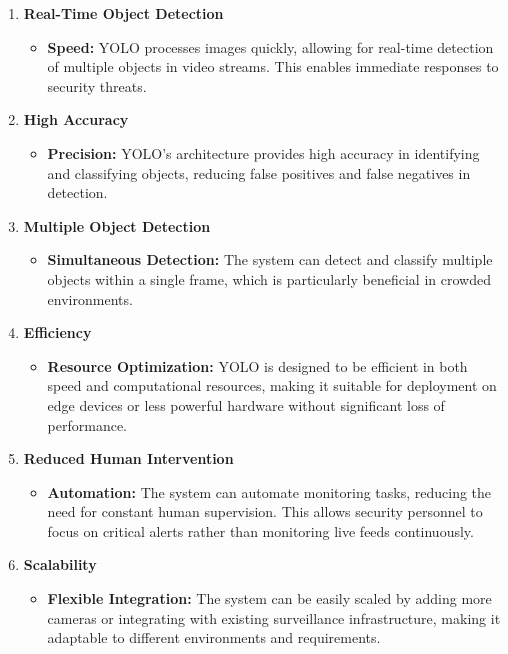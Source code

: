 \documentclass[openany,12pt]{report}
\begin{document}
\begin{enumerate}
    \item \textbf{Real-Time Object Detection}
    \begin{itemize}
        \item \textbf{Speed:} YOLO processes images quickly, allowing for real-time detection of multiple objects in video streams. This enables immediate responses to security threats.
    \end{itemize}
    
    \item \textbf{High Accuracy}
    \begin{itemize}
        \item \textbf{Precision:} YOLO's architecture provides high accuracy in identifying and classifying objects, reducing false positives and false negatives in detection.
    \end{itemize}

    \item \textbf{Multiple Object Detection}
    \begin{itemize}
        \item \textbf{Simultaneous Detection:} The system can detect and classify multiple objects within a single frame, which is particularly beneficial in crowded environments.
    \end{itemize}

    \item \textbf{Efficiency}
    \begin{itemize}
        \item \textbf{Resource Optimization:} YOLO is designed to be efficient in both speed and computational resources, making it suitable for deployment on edge devices or less powerful hardware without significant loss of performance.
    \end{itemize}

    \item \textbf{Reduced Human Intervention}
    \begin{itemize}
        \item \textbf{Automation:} The system can automate monitoring tasks, reducing the need for constant human supervision. This allows security personnel to focus on critical alerts rather than monitoring live feeds continuously.
    \end{itemize}

    \item \textbf{Scalability}
    \begin{itemize}
        \item \textbf{Flexible Integration:} The system can be easily scaled by adding more cameras or integrating with existing surveillance infrastructure, making it adaptable to different environments and requirements.
    \end{itemize}


\end{enumerate}
\end{document}
